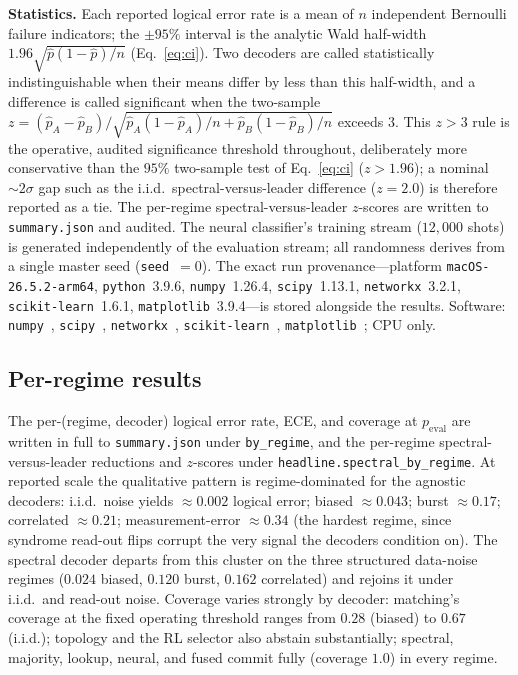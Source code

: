 \documentclass[reprint,aps,prxquantum,amsmath,amssymb,floatfix,nofootinbib,longbibliography]{revtex4-2}
\theoremstyle{definition}
\theoremstyle{remark}
\theoremstyle{plain}
\newcommand{\sync}[1]{#1}
\begin{document}
\textbf{Statistics.} Each reported logical error rate is a mean of $n$ independent Bernoulli failure indicators; the $\pm95\%$ interval is the analytic Wald half-width $1.96\sqrt{\hat p(1-\hat p)/n}$ (Eq.~\eqref{eq:ci}). Two decoders are called statistically indistinguishable when their means differ by less than this half-width, and a difference is called significant when the two-sample $z=(\hat p_A-\hat p_B)/\sqrt{\hat p_A(1-\hat p_A)/n+\hat p_B(1-\hat p_B)/n}$ exceeds $3$. This $z>3$ rule is the operative, audited significance threshold throughout, deliberately more conservative than the $95\%$ two-sample test of Eq.~\eqref{eq:ci} ($z>1.96$); a nominal $\sim\!2\sigma$ gap such as the i.i.d.\ spectral-versus-leader difference ($z=\sync{2.0}$) is therefore reported as a tie. The per-regime spectral-versus-leader $z$-scores are written to \texttt{summary.json} and audited. The neural classifier's training stream ($\sync{12{,}000}$ shots) is generated independently of the evaluation stream; all randomness derives from a single master seed (\texttt{seed}~$=\sync{0}$). The exact run provenance---platform \texttt{macOS-26.5.2-arm64}, \texttt{python}~\sync{3.9.6}, \texttt{numpy}~\sync{1.26.4}, \texttt{scipy}~\sync{1.13.1}, \texttt{networkx}~\sync{3.2.1}, \texttt{scikit-learn}~\sync{1.6.1}, \texttt{matplotlib}~\sync{3.9.4}---is stored alongside the results. Software: \texttt{numpy}~\cite{harris2020array}, \texttt{scipy}~\cite{virtanen2020scipy}, \texttt{networkx}~\cite{hagberg2008exploring}, \texttt{scikit-learn}~\cite{pedregosa2011scikit}, \texttt{matplotlib}~\cite{hunter2007matplotlib}; CPU only.

\subsection{Per-regime results}
\label{sec:methods_perregime}
The per-(regime, decoder) logical error rate, ECE, and coverage at $p_{\mathrm{eval}}$ are written in full to \texttt{summary.json} under \texttt{by\_regime}, and the per-regime spectral-versus-leader reductions and $z$-scores under \texttt{headline.spectral\_by\_regime}. At reported scale the qualitative pattern is regime-dominated for the agnostic decoders: i.i.d.\ noise yields $\approx\sync{0.002}$ logical error; biased $\approx\sync{0.043}$; burst $\approx\sync{0.17}$; correlated $\approx\sync{0.21}$; measurement-error $\approx\sync{0.34}$ (the hardest regime, since syndrome read-out flips corrupt the very signal the decoders condition on). The spectral decoder departs from this cluster on the three structured data-noise regimes ($\sync{0.024}$ biased, $\sync{0.120}$ burst, $\sync{0.162}$ correlated) and rejoins it under i.i.d.\ and read-out noise. Coverage varies strongly by decoder: matching's coverage at the fixed operating threshold ranges from $\sync{0.28}$ (biased) to $\sync{0.67}$ (i.i.d.); topology and the RL selector also abstain substantially; spectral, majority, lookup, neural, and fused commit fully (coverage $1.0$) in every regime.
\end{document}
